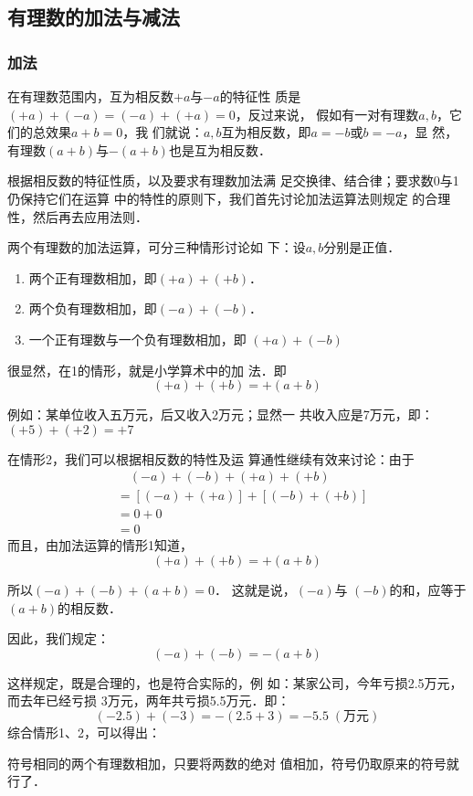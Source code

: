 \subsection{有理数的加法与减法}
\subsubsection{加法}

在有理数范围内，互为相反数$+a$与$-a$的特征性
质是$(+a) + (-a)=(-a) + (+a) = 0$，反过来说，
假如有一对有理数$a,  b$，它们的总效果$a+b= 0$，我
们就说：$a,  b$互为相反数，即$a=-b$或$b=-a$，显
然，有理数$(a + b)$与$-(a + b)$也是互为相反数．

    根据相反数的特征性质，以及要求有理数加法满
足交换律、结合律；要求数0与1仍保持它们在运算
中的特性的原则下，我们首先讨论加法运算法则规定
的合理性，然后再去应用法则．

    两个有理数的加法运算，可分三种情形讨论如
下：设$a,  b$分别是正值．
\begin{enumerate}
    \item 两个正有理数相加，即$(+ a)+(+b)$．
    \item 两个负有理数相加，即$(-a)+(-b)$．
    \item 一个正有理数与一个负有理数相加，即
  $(+a)+(-b)$
\end{enumerate}

    很显然，在1的情形，就是小学算术中的加
法．即
\[(+a)+(+b)=+(a+b)\]

例如：某单位收入五万元，后又收入2万元；显然一
共收入应是7万元，即：$(+5)+(+2)=+7$

    在情形2，我们可以根据相反数的特性及运
算通性继续有效来讨论：由于
\begin{align*}
    &\quad (-a) +(-b) + (+a) + (+b)\\
    &=[(-a)+(+a)]+[(-b)+(+b)]
          \tag{加法交换、结合律}\\
          &=0+0\tag{相反数的特性}\\
          &=0\tag{零的运算}
\end{align*}
而且，由加法运算的情形1知道，
\[(+a)+(+b)=+(a+b)\]

所以$( - a) + (- b) + (a + b) = 0$．
这就是说，$( - a)$与
$(-b)$的和，应等于$(a + b)$的相反数．

因此，我们规定：
\[(-a)+(-b)=-(a+b)\]

这样规定，既是合理的，也是符合实际的，例
如：某家公司，今年亏损2.5万元，而去年已经亏损
3万元，两年共亏损5.5万元．即：
\[(-2. 5)+(-3)=-(2.5+3)=-5.5\; (\text{万元})\]
综合情形1、2，可以得出：
\begin{blk}{}
    符号相同的两个有理数相加，只要将两数的绝对
    值相加，符号仍取原来的符号就行了．
\end{blk}

